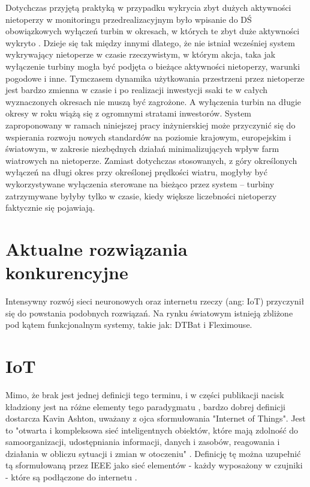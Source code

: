 \documentclass{sprz}
\begin{document}
Dotychczas przyjętą praktyką w przypadku wykrycia zbyt dużych aktywności nietoperzy w monitoringu przedrealizacyjnym było wpisanie do DŚ obowiązkowych wyłączeń turbin w okresach, w których te zbyt duże aktywności wykryto \cite{Wytyczne}. Dzieje się tak między innymi dlatego, że nie istniał wcześniej system wykrywający nietoperze w czasie rzeczywistym, w którym akcja, taka jak wyłączenie turbiny mogła być podjęta o bieżące aktywności nietoperzy, warunki pogodowe i inne. Tymczasem dynamika użytkowania przestrzeni przez nietoperze jest bardzo zmienna w czasie i po realizacji inwestycji ssaki te w całych wyznaczonych okresach nie muszą być zagrożone. A wyłączenia turbin na długie okresy w roku wiążą się z ogromnymi stratami inwestorów. System zaproponowany w ramach niniejszej pracy inżynierskiej może przyczynić się do wspierania rozwoju nowych standardów na poziomie krajowym, europejskim i światowym, w zakresie niezbędnych działań minimalizujących wpływ farm wiatrowych na nietoperze. Zamiast dotychczas stosowanych, z góry określonych wyłączeń na długi okres przy określonej prędkości wiatru, mogłyby być wykorzystywane wyłączenia sterowane na bieżąco przez system – turbiny zatrzymywane byłyby tylko w czasie, kiedy większe liczebności nietoperzy faktycznie się pojawiają.

\section{Aktualne rozwiązania konkurencyjne}

Intensywny rozwój sieci neuronowych oraz internetu rzeczy (ang: IoT) przyczynił się do powstania podobnych rozwiązań. Na rynku światowym istnieją zbliżone pod kątem funkcjonalnym systemy, takie jak: DTBat i Fleximouse.

\section{IoT}

Mimo, że brak jest jednej definicji tego terminu, i w części publikacji nacisk kładziony jest na różne elementy tego paradygmatu \cite{iot-gov}, bardzo dobrej definicji dostarcza Kavin Ashton, uważany z ojca sformułowania "Internet of Things". Jest to "otwarta i kompleksowa sieć inteligentnych obiektów, które mają zdolność do samoorganizacji, udostępniania informacji, danych i zasobów, reagowania i działania w obliczu sytuacji i zmian w otoczeniu" \cite{Ashton2002}. Definicję tę można uzupełnić tą sformułowaną przez IEEE jako sieć elementów - każdy wyposażony w czujniki - które są podłączone do internetu \cite{IEEE-iot}.
\end{document}
